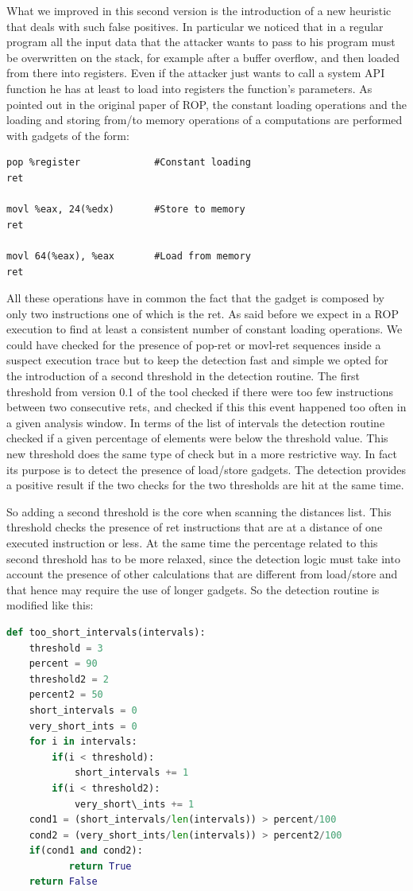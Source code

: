 \documentclass[Lau,binding=0.6cm]{sapthesis}
\begin{document}
What we improved in this second version is the introduction of a new heuristic that deals with such false positives. In particular we noticed that in a regular program all the input data that the attacker wants to pass to his program must be overwritten on the stack, for example after a buffer overflow, and then loaded from there into registers. Even if the attacker just wants to call a system API function he has at least to load into registers the function’s parameters. As pointed out in the original paper of ROP, the constant loading operations and the loading and storing from/to memory operations of a computations are performed with gadgets of the form:

\begin{lstlisting}[language={[x86masm]Assembler}]
pop %register             #Constant loading
ret

movl %eax, 24(%edx)       #Store to memory
ret

movl 64(%eax), %eax       #Load from memory
ret
\end{lstlisting}

All these operations have in common the fact that the gadget is composed by only two instructions one of which is the ret. 
As said before we expect in a ROP execution to find at least a consistent number of constant loading operations. We could have checked for the presence of pop-ret or movl-ret sequences inside a suspect execution trace but to keep the detection fast and simple we opted for the introduction of a second threshold in the detection routine. The first threshold from version 0.1 of the tool checked if there were too few instructions between two consecutive rets, and checked if this this event happened too often in a given analysis window. In terms of the list of intervals the detection routine checked if a given percentage of elements were below the threshold value.
This new threshold does the same type of check but in a more restrictive way. In fact its purpose is to detect the presence of load/store gadgets. The detection provides a positive result if the two checks for the two thresholds are hit at the same time.

So adding a second threshold is the core when scanning the distances list. This threshold checks the presence of ret instructions that are at a distance of one executed instruction or less. At the same time the percentage related to this second threshold has to be more relaxed, since the detection logic must take into account the presence of other calculations that are different from load/store and that hence may require the use of longer gadgets. So the detection routine is modified like this:
\begin{lstlisting}[language=Python]
def too_short_intervals(intervals):
    threshold = 3
    percent = 90
    threshold2 = 2
    percent2 = 50
    short_intervals = 0
    very_short_ints = 0
    for i in intervals:
        if(i < threshold):
            short_intervals += 1
        if(i < threshold2):
            very_short\_ints += 1
    cond1 = (short_intervals/len(intervals)) > percent/100
    cond2 = (very_short_ints/len(intervals)) > percent2/100
    if(cond1 and cond2):
           return True
    return False
\end{lstlisting}
\end{document}
